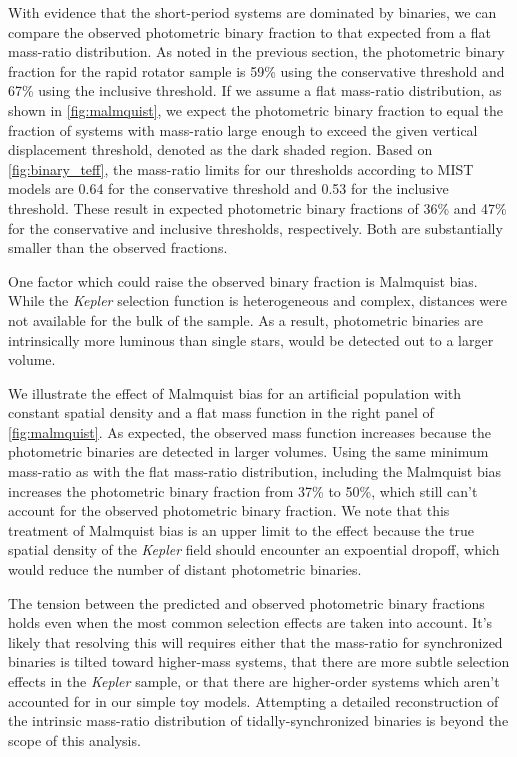 \documentclass[twocolumn]{aastex6}
\newcommand{\Kepler}{\mbox{\textit{Kepler}}}
\begin{document}
With evidence that the short-period systems are dominated by binaries, we
can compare the observed photometric binary fraction to that expected from a
flat mass-ratio distribution. As noted in the previous section, the photometric
binary fraction for the rapid rotator sample is 59\% using the conservative
threshold and 67\% using the inclusive threshold. If we assume a flat
mass-ratio distribution, as shown in \cref{fig:malmquist}, we expect the 
photometric binary fraction to equal the fraction of systems with mass-ratio 
large enough to exceed the given vertical displacement threshold, denoted as
the dark shaded region. Based on \cref{fig:binary_teff}, the
mass-ratio limits for our thresholds according to MIST models are 0.64 for the
conservative threshold and 0.53 for the inclusive threshold. These result in
expected photometric binary fractions of 36\% and 47\% for the conservative and
inclusive thresholds, respectively. Both are substantially smaller than the
observed fractions. 

One factor which could raise the observed binary fraction is Malmquist bias. 
While the \Kepler{} selection function is heterogeneous and complex, distances
were not available for the bulk of the sample. As a result, photometric binaries 
are intrinsically more luminous than single stars, would be detected out to a
larger volume. 

We illustrate the effect of Malmquist bias for
an artificial population with constant spatial density and a flat mass
function in the right panel of \cref{fig:malmquist}. As expected, the observed
mass function increases because the photometric binaries are detected in larger
volumes. Using the same minimum mass-ratio as with the flat mass-ratio
distribution, including the Malmquist bias increases the photometric binary 
fraction from 37\% to 50\%, which still can't account for the observed 
photometric binary fraction. We note that this treatment of
Malmquist bias is an upper limit to the effect because the true spatial density 
of the \Kepler{} field should encounter an expoential dropoff, which would 
reduce the number of distant photometric binaries.  

The tension between the predicted and observed photometric binary
fractions holds even when the most common selection effects are taken into
account. It's likely that resolving this will requires either that the 
mass-ratio for synchronized binaries is tilted toward higher-mass systems, that 
there are more subtle selection effects in the \Kepler{} sample, or that
there are higher-order systems which aren't accounted for in our simple toy
models. Attempting a detailed reconstruction of the intrinsic 
mass-ratio distribution of tidally-synchronized binaries is beyond the scope 
of this analysis.
\end{document}
